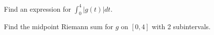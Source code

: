 \documentclass{ximera}
\begin{document}
\begin{exercise}
Find an expression for $\int_0^4 \left|g(t)\right| dt$.
\begin{multipleChoice}
\end{multipleChoice}

Find the midpoint Riemann sum for $g$ on $[0,4]$ with 2 subintervals.
\begin{multipleChoice}
\end{multipleChoice}

\end{exercise}
\end{document}
